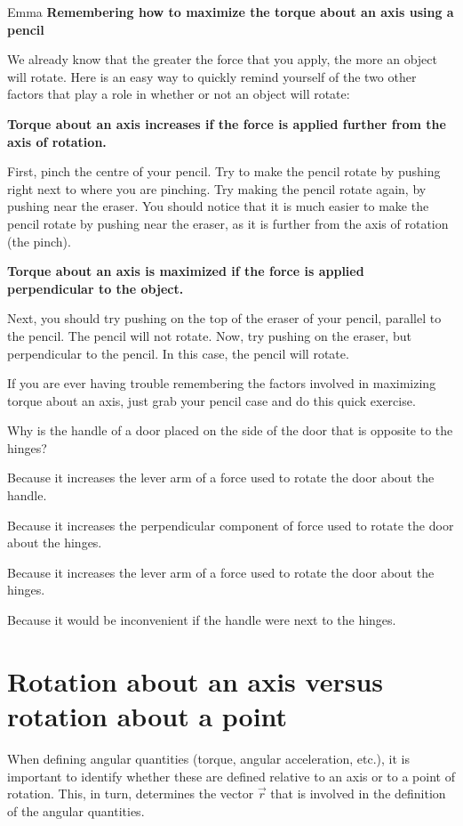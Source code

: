 \begin{studentOpinion}{Emma}
\textbf{Remembering how to maximize the torque about an axis using a pencil}

We already know that the greater the force that you apply, the more an object will rotate. Here is an easy way to quickly remind yourself of the two other factors that play a role in whether or not an object will rotate:

\textbf{Torque about an axis increases if the force is applied further from the axis of rotation.}

First, pinch the centre of your pencil. Try to make the pencil rotate by pushing right next to where you are pinching. Try making the pencil rotate again, by pushing near the eraser. You should notice that it is much easier to make the pencil rotate by pushing near the eraser, as it is further from the axis of rotation (the pinch).

\textbf{Torque about an axis is maximized if the force is applied perpendicular to the object.}

Next, you should try pushing on the top of the eraser of your pencil, parallel to the pencil. The pencil will not rotate. Now, try pushing on the eraser, but perpendicular to the pencil. In this case, the pencil will rotate.

If you are ever having trouble remembering the factors involved in maximizing torque about an axis, just grab your pencil case and do this quick exercise. 
\end{studentOpinion}

\begin{checkpoint}
\begin{MCquestion}{Why is the handle of a door placed on the side of the door that is opposite to the hinges?}
\item Because it increases the lever arm of a force used to rotate the door about the handle.
\item Because it increases the perpendicular component of force used to rotate the door about the hinges.
\item Because it increases the lever arm of a force used to rotate the door about the hinges. \correct
\item Because it would be inconvenient if the handle were next to the hinges.
\end{MCquestion}
\end{checkpoint}

\section{Rotation about an axis versus rotation about a point}
When defining angular quantities (torque, angular acceleration, etc.), it is important to identify whether these are defined relative to an axis or to a point of rotation. This, in turn, determines the vector $\vec r$ that is involved in the definition of the angular quantities.

